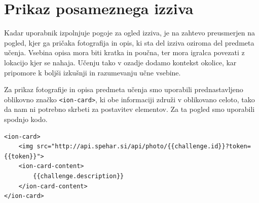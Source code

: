 \documentclass[a4paper, 12pt]{book}
\begin{document}
\section{Prikaz posameznega izziva}
Kadar uporabnik izpolnjuje pogoje za ogled izziva, je na zahtevo preusmerjen na pogled, kjer ga pričaka fotografija in opis, ki sta del izziva oziroma del predmeta učenja. Vsebina opisa mora biti kratka in poučna, ter mora igralca povezati z lokacijo kjer se nahaja. Učenju tako v ozadje dodamo kontekst okolice, kar pripomore k boljši izkušnji in razumevanju učne vsebine.

Za prikaz fotografije in opisa predmeta učenja smo uporabili prednastavljeno oblikovno značko \texttt{<ion-card>}, ki obe informaciji združi v oblikovano celoto, tako da nam ni potrebno skrbeti za postavitev elementov. Za ta pogled smo uporabili spodnjo kodo.
\begin{lstlisting}
<ion-card>
    <img src="http://api.spehar.si/api/photo/{{challenge.id}}?token={{token}}">
    <ion-card-content>
        {{challenge.description}}
    </ion-card-content>
</ion-card>
\end{lstlisting}
\end{document}
